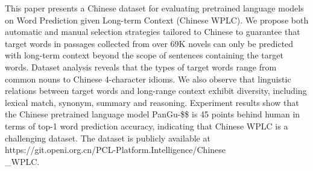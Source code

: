 This paper presents a Chinese dataset for evaluating pretrained language models on Word Prediction given Long-term Context (Chinese WPLC). We propose both automatic and manual selection strategies tailored to Chinese to guarantee that target words in passages collected from over 69K novels can only be predicted with long-term context beyond the scope of sentences containing the target words. Dataset analysis reveals that the types of target words range from common nouns to Chinese 4-character idioms. We also observe that linguistic relations between target words and long-range context exhibit diversity, including lexical match, synonym, summary and reasoning. Experiment results show that the Chinese pretrained language model PanGu-\$\alpha\$ is 45 points behind human in terms of top-1 word prediction accuracy, indicating that Chinese WPLC is a challenging dataset. The dataset is publicly available at https://git.openi.org.cn/PCL-Platform.Intelligence/Chinese\\_WPLC.
